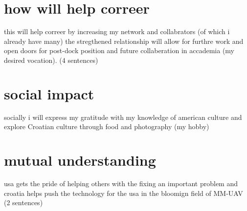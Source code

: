 \documentclass[12pt]{article}
\begin{document}
\section{how will help correer} 
this will help correer by increasing my network and collabrators (of which i already have many)  the stregthened relationship will allow for furthre work and open doors for post-dock position and future collaberation in accademia (my desired vocation).  (4 sentences)

\section{social impact}
socially i will express my gratitude with my knowledge of american culture and explore Croatian culture through food and photography (my hobby)

\section{mutual understanding}
usa gets the pride of helping others with the fixing an important problem and croatia helps push the technology for the usa in the bloomign field of MM-UAV (2 sentences)
\end{document}
